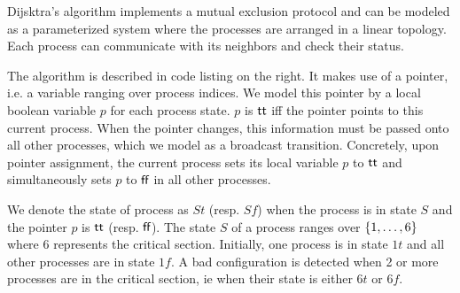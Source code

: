 \label{app:dijkstra}
Dijsktra's algorithm %
 implements a mutual
exclusion protocol and can be modeled as a parameterized system where
the processes are arranged in a linear topology. Each process can
communicate with its neighbors and check their status.

\begin{wrapfigure}{r}[0pt]{0.55\linewidth}
  \hfill%
  \vspace{-24pt}
  
  \vspace{-20pt}
\end{wrapfigure}
%
The algorithm is described in code listing on the right.
%
It makes use of a pointer, i.e. a variable ranging over
process indices. We model this pointer by a local boolean variable $p$
for each process state.
%
$p$ is $\textsf{tt}$ iff the pointer points to this current process. When
the pointer changes, this information must be passed onto all other
processes, which we model as a broadcast transition. Concretely, upon
pointer assignment, the current process sets its local variable $p$ to
$\textsf{tt}$ and simultaneously sets $p$ to $\textsf{ff}$ in all other
processes.

We denote the state of process as $St$ (resp. $Sf$) when the process
is in state $S$ and the pointer $p$ is $\textsf{tt}$ (resp. $\textsf{ff}$). The
state $S$ of a process ranges over $\{1,\ldots,6\}$ where $6$
represents the critical section.
%
Initially, one process is in state $1t$ and all other processes are in
state $1f$. A bad configuration is detected when 2 or more processes
are in the critical section, ie when their state is either $6t$ or
$6f$.

